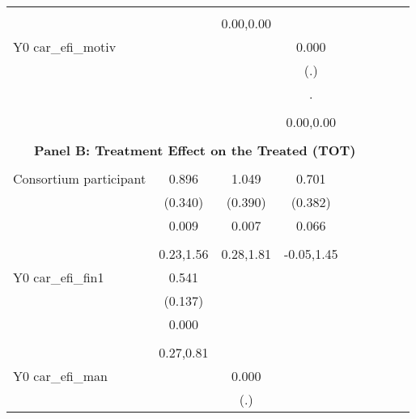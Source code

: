 \begin{table}[!h]
\begin{adjustbox}{width=\columnwidth,center}
\begin{tabular}{l*{8}{c}}
                    &                     &                     &                     \\
                    &                     &   0.00,0.00         &                     \\
Y0 car\_efi\_motiv    &                     &                     &       0.000         \\
                    &                     &                     &         (.)         \\
                    &                     &                     &           .         \\
                    &                     &                     &                     \\
                    &                     &                     &   0.00,0.00         \\
\hline \\ \multicolumn{7}{c}{\textbf{Panel B: Treatment Effect on the Treated (TOT)}} \\\\[-1ex]
Consortium participant&       0.896\sym{***}&       1.049\sym{***}&       0.701\sym{*}  \\
                    &     (0.340)         &     (0.390)         &     (0.382)         \\
                    &       0.009         &       0.007         &       0.066         \\
                    &                     &                     &                     \\
                    &   0.23,1.56         &   0.28,1.81         &  -0.05,1.45         \\
Y0 car\_efi\_fin1     &       0.541\sym{***}&                     &                     \\
                    &     (0.137)         &                     &                     \\
                    &       0.000         &                     &                     \\
                    &                     &                     &                     \\
                    &   0.27,0.81         &                     &                     \\
Y0 car\_efi\_man      &                     &       0.000         &                     \\
                    &                     &         (.)         &                     \\

\end{tabular}
\end{adjustbox}
\end{table}
